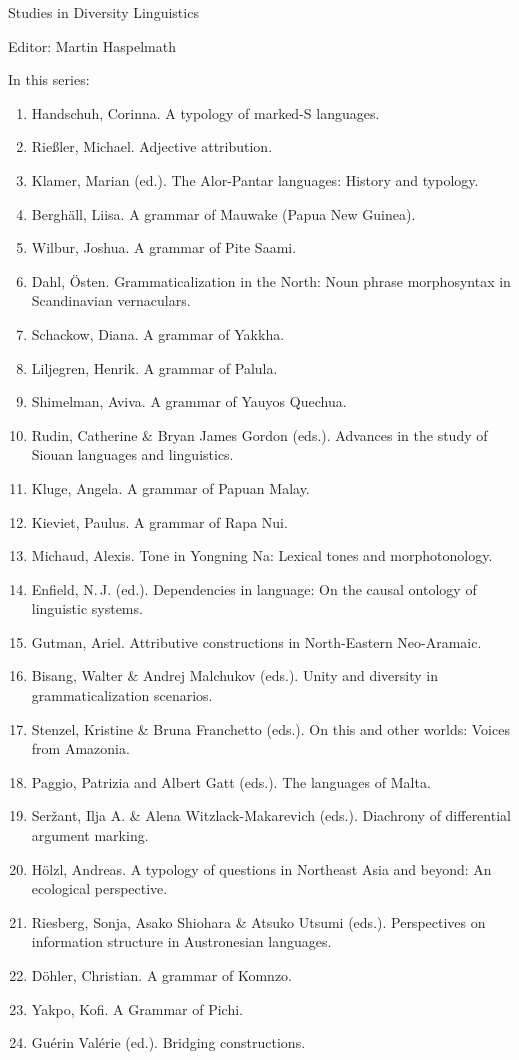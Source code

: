 {\large Studies in Diversity Linguistics}

\bigskip

Editor: Martin Haspelmath  

 
\bigskip 
In this series:

\largerpage[3]
\small
\begin{enumerate}
\item Handschuh, Corinna. A typology of marked-S languages.
\item Rießler, Michael. Adjective attribution.
\item Klamer, Marian (ed.). The Alor-Pantar languages: History and typology.
\item Berghäll, Liisa. A grammar of Mauwake (Papua New Guinea).
\item Wilbur, Joshua. A grammar of Pite Saami.
\item Dahl, Östen. Grammaticalization in the North: Noun phrase morphosyntax in Scandinavian vernaculars.
\item Schackow, Diana.    A grammar of Yakkha.
\item Liljegren, Henrik. A grammar of Palula.
\item Shimelman, Aviva. A grammar of Yauyos Quechua.
\item Rudin, Catherine \& Bryan James Gordon (eds.). Advances in the study of Siouan languages and linguistics.
\item Kluge, Angela. A grammar of Papuan Malay.
\item Kieviet, Paulus. A grammar of Rapa Nui.
\item Michaud, Alexis. Tone in Yongning Na: Lexical tones and morphotonology.
\item Enfield, N.\,J. (ed.).  Dependencies in language: On the causal ontology of linguistic systems.
\item Gutman, Ariel. Attributive constructions in North-Eastern Neo-Aramaic.
\item Bisang, Walter \& Andrej Malchukov (eds.). Unity and diversity in grammaticalization scenarios.
\item Stenzel, Kristine \& Bruna Franchetto (eds.). On this and other worlds: Voices from Amazonia.
\item Paggio, Patrizia and Albert Gatt (eds.). The languages of Malta.
\item Seržant, Ilja A.  \& Alena Witzlack-Makarevich (eds.). Diachrony of differential argument marking.
\item Hölzl, Andreas. A typology of questions in Northeast Asia and beyond: An ecological perspective.
\item Riesberg, Sonja,  Asako Shiohara \& Atsuko Utsumi (eds.). Perspectives on information structure in Austronesian languages.
\item Döhler, Christian. A grammar of Komnzo.
\item Yakpo, Kofi. A Grammar of Pichi.
\item Guérin Valérie (ed.). Bridging constructions.
\end{enumerate}
 
